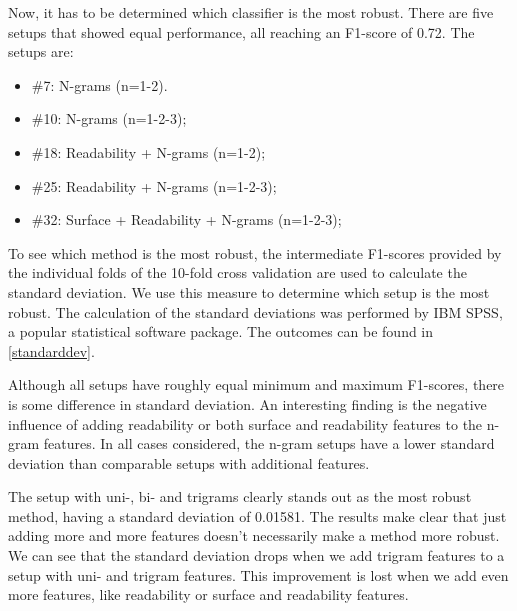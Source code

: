 \documentclass[
10pt, %
a4paper, %
oneside, %
headinclude,footinclude, %
] {book}%
\begin{document}
Now, it has to be determined which classifier is the most robust. There are five setups that showed equal performance, all reaching an F1-score of 0.72. The setups are:
\begin{itemize}
\item \#7: N-grams (n=1-2).
\item \#10: N-grams (n=1-2-3);
\item \#18: Readability + N-grams (n=1-2);
\item \#25: Readability + N-grams (n=1-2-3);
\item \#32: Surface + Readability + N-grams (n=1-2-3);
\end{itemize}

To see which method is the most robust, the intermediate F1-scores provided by the individual folds of the 10-fold cross validation are used to calculate the standard deviation. We use this measure to determine which setup is the most robust. The calculation of the standard deviations was performed by IBM SPSS, a popular statistical software package. The outcomes can be found in \autoref{standarddev}.

Although all setups have roughly equal minimum and maximum F1-scores, there is some difference in standard deviation. An interesting finding is the negative influence of adding readability or both surface and readability features to the n-gram features. In all cases considered, the n-gram setups have a lower standard deviation than comparable setups with additional features.

The setup with uni-, bi- and trigrams clearly stands out as the most robust method, having a standard deviation of 0.01581. The results make clear that just adding more and more features doesn't necessarily make a method more robust. We can see that the standard deviation drops when we add trigram features to a setup with uni- and trigram features. This improvement is lost when we add even more features, like readability or surface and readability features. 
\end{document}
